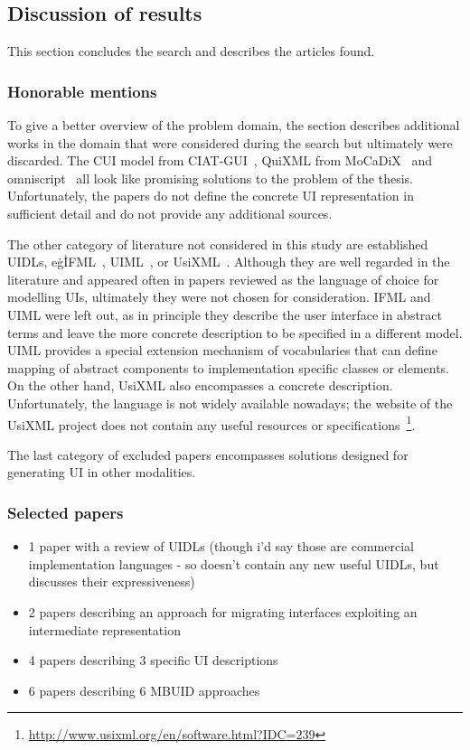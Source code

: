 \subsection{Discussion of results}\label{subsec:discussion-of-results}

This section concludes the search and describes the articles found.

\subsubsection{Honorable mentions}
To give a better overview of the problem domain, the section describes additional works in the domain that were considered during the search but ultimately were discarded.
The CUI model from CIAT-GUI~\cite{Molina2012-my}, QuiXML from MoCaDiX~\cite{Vanderdonckt2019-av} and omniscript~\cite{Ulusoy2019-jh} all look like promising solutions to the problem of the thesis.
Unfortunately, the papers do not define the concrete UI representation in sufficient detail and do not provide any additional sources.

The other category of literature not considered in this study are established UIDLs, e\.g\. IFML~\cite{Brambilla2014-ln}, UIML~\cite{Abrams1999}, or UsiXML~\cite{Limbourg2005}.
Although they are well regarded in the literature and appeared often in papers reviewed as the language of choice for modelling UIs, ultimately they were not chosen for consideration.
IFML and UIML were left out, as in principle they describe the user interface in abstract terms and leave the more concrete description to be specified in a different model.
UIML provides a special extension mechanism of vocabularies that can define mapping of abstract components to implementation specific classes or elements.
On the other hand, UsiXML also encompasses a concrete description.
Unfortunately, the language is not widely available nowadays;
the website of the UsiXML project does not contain any useful resources or specifications~\footnote{\url{http://www.usixml.org/en/software.html?IDC=239}}.

The last category of excluded papers encompasses solutions designed for generating UI in other modalities.

\subsubsection{Selected papers}

\begin{itemize}
    \item 1 paper with a review of UIDLs (though i'd say those are commercial implementation languages - so doesn't contain any new useful UIDLs, but discusses their expressiveness)
    \item 2 papers describing an approach for migrating interfaces exploiting an intermediate representation
    \item 4 papers describing 3 specific UI descriptions
    \item 6 papers describing 6 MBUID approaches
\end{itemize}


